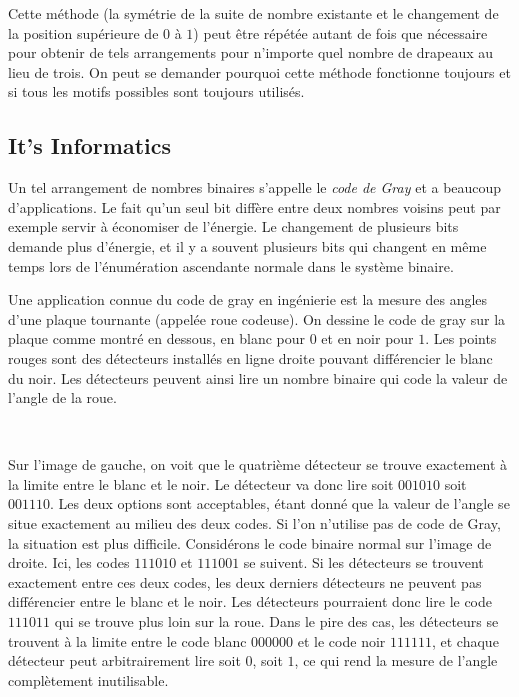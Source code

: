 \documentclass[a4paper,11pt]{report}
\newcommand{\taskGraphicsFolder}{..}
\begin{document}
Cette méthode (la symétrie de la suite de nombre existante et le changement de la position supérieure de $0$ à $1$) peut être répétée autant de fois que nécessaire pour obtenir de tels arrangements pour n’importe quel nombre de drapeaux au lieu de trois. On peut se demander pourquoi cette méthode fonctionne toujours et si tous les motifs possibles sont toujours utilisés.


\subsection*{It’s Informatics}

Un tel arrangement de nombres binaires s’appelle le \emph{code de Gray} et a beaucoup d’applications. Le fait qu’un seul bit diffère entre deux nombres voisins peut par exemple servir à économiser de l’énergie. Le changement de plusieurs bits demande plus d’énergie, et il y a souvent plusieurs bits qui changent en même temps lors de l’énumération ascendante normale dans le système binaire.

Une application connue du code de gray en ingénierie est la mesure des angles d’une plaque tournante (appelée roue codeuse). On dessine le code de gray sur la plaque comme montré en dessous, en blanc pour $0$ et en noir pour $1$. Les points rouges sont des détecteurs installés en ligne droite pouvant différencier le blanc du noir. Les détecteurs peuvent ainsi lire un nombre binaire qui code la valeur de l’angle de la roue.

{\centering%
\raisebox{-0.5ex}{}~~~
\raisebox{-0.5ex}{}\par}

Sur l’image de gauche, on voit que le quatrième détecteur se trouve exactement à la limite entre le blanc et le noir. Le détecteur va donc lire soit $001010$ soit $001110$. Les deux options sont acceptables, étant donné que la valeur de l’angle se situe exactement au milieu des deux codes. Si l’on n’utilise pas de code de Gray, la situation est plus difficile. Considérons le code binaire normal sur l’image de droite. Ici, les codes $111010$ et $111001$ se suivent. Si les détecteurs se trouvent exactement entre ces deux codes, les deux derniers détecteurs ne peuvent pas différencier entre le blanc et le noir. Les détecteurs pourraient donc lire le code $111011$ qui se trouve plus loin sur la roue. Dans le pire des cas, les détecteurs se trouvent à la limite entre le code blanc $000000$ et le code noir $111111$, et chaque détecteur peut arbitrairement lire soit $0$, soit $1$, ce qui rend la mesure de l’angle complètement inutilisable.
\end{document}
